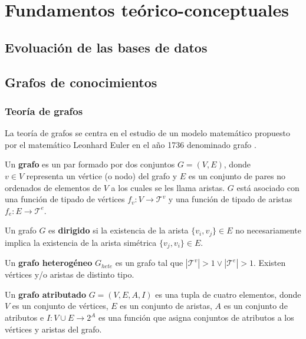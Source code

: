 \chapter{Fundamentos te\'orico-conceptuales}\label{chapter:bi-industry-4.0}

\section{Evoluación de las bases de datos}

\section{Grafos de conocimientos}

\subsection{Teor\'ia de grafos}

La teor\'ia de grafos se centra en el estudio de un modelo
matem\'atico propuesto por el matem\'atico Leonhard Euler en el
a\~no 1736 denominado grafo \cite{estrada2012structure}.

\begin{definition}
    Un \textbf{grafo} es un par formado por dos conjuntos $G = (V,E)$, 
    donde \\ $v \in V$ representa un v\'ertice (o nodo) del grafo y $E$ es un conjunto
    de pares no ordenados de elementos de $V$ a los cuales se les llama aristas. $G$ est\'a asociado con una funci\'on de tipado de v\'ertices $f_v: V \to \mathcal{T}^v$ y 
    una funci\'on de tipado de aristas $f_e : E \to \mathcal{T}^e$.  
\end{definition}

\begin{definition}
    Un grafo $G$ es \textbf{dirigido} si la existencia de la arista $\{v_i, v_j\} \in E$ no
    necesariamente implica la existencia de la arista sim\'etrica $\{v_j, v_i\} \in E$.
\end{definition}

\begin{definition}
    Un \textbf{grafo heterog\'eneo} $G_{hete}$ es un grafo tal 
    que $|\mathcal{T}^v| > 1 \vee |\mathcal{T}^e| > 1$. Existen v\'ertices y/o aristas
    de distinto tipo.
\end{definition}

\begin{definition}
    Un \textbf{grafo atributado} $G = (V,E,A,I)$ es una tupla de cuatro
    elementos, donde $V$ es un conjunto
    de v\'ertices, $E$ es un conjunto de aristas, $A$ es un
    conjunto de atributos e $I : V \cup E \to 2^A$ es una
    funci\'on que asigna conjuntos de atributos a los v\'ertices
    y aristas del grafo.
\end{definition}

